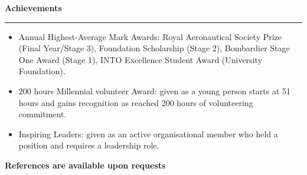 \documentclass[11pt]{resume} %
\begin{document}
{\large \bf Achievements} \sectionlineskip \hrule 
\begin{itemize}
    \item{
        Annual Highest-Average Mark Awards: Royal Aeronautical Society Prize (Final Year/Stage 3), 
        Foundation Scholarship (Stage 2), Bombardier Stage One Award (Stage 1), 
        INTO Excellence Student Award (University Foundation).
        }
    \vspace{-1mm}
    \item{
        200 hours Millennial volunteer Award: given as a young person starts 
        at 51 hours and gains recognition as reached 200 hours of volunteering commitment.
    }
    \vspace{-1mm}
    \item{
        Inspiring Leaders: given as an active organisational member 
        who held a position and requires a leadership role.}
\end{itemize}

\begin{center}
    \vspace{2mm}
    \small{\bf References are available upon requests}
\end{center}
\end{document}
